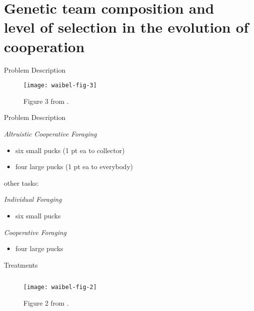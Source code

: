\section{Genetic team composition and level of selection in the evolution of cooperation \cite{waibel2009genetic}}

\begin{frame}{Problem Description}

\begin{figure}
\texttt{[image: waibel-fig-3]}
\vspace{1ex}
\caption{
Figure 3 from \cite{waibel2009genetic}.
}
\end{figure}

\end{frame}

\begin{frame}{Problem Description}

\textit{Altruistic Cooperative Foraging}
\begin{itemize}
\item six small pucks (1 pt ea to collector)
\item four large pucks (1 pt ea to everybody)
\end{itemize}

other tasks:

\textit{Individual Foraging}
\begin{itemize}
\item six small pucks
\end{itemize}

\textit{Cooperative Foraging}
\begin{itemize}
\item four large pucks
\end{itemize}

\end{frame}


\begin{frame}{Treatments}

\begin{figure}
\begin{columns}
\begin{column}{0.7\textwidth}
\texttt{[image: waibel-fig-2]}
\end{column}
\begin{column}{0.3\textwidth}
\caption{
Figure 2 from \cite{waibel2009genetic}.
}
\end{column}
\end{columns}
\end{figure}

\end{frame}

